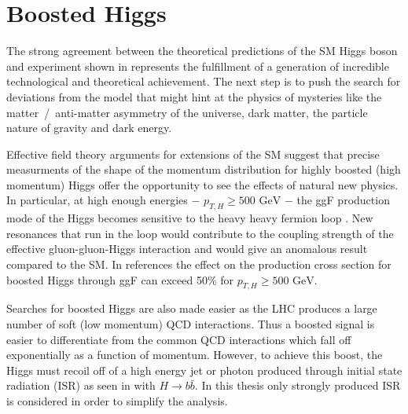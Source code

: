 \section{Boosted Higgs} \label{sec:higgs:boosted}

The strong agreement between the theoretical predictions of the SM Higgs boson
and experiment shown in  represents the
fulfillment of a generation of incredible technological and theoretical
achievement.  The next step is to push the search for deviations from the model
that might hint at the physics of mysteries like the matter~/~anti-matter
asymmetry of the universe, dark matter, the particle nature of gravity and dark
energy. 

Effective field theory arguments for extensions of the SM suggest that precise
measurments of the shape of the momentum distribution for highly boosted (high
momentum) Higgs offer the opportunity to see the effects of natural new
physics.  In particular, at high enough energies $-$ $p_{T,H} \geq \text{500
GeV}$ $-$ the ggF production mode of the Higgs becomes sensitive to the heavy
heavy fermion loop \cite{Schlaffer:2014osa}.  New resonances that run in the
loop would contribute to the coupling strength of the effective
gluon-gluon-Higgs interaction and would give an anomalous result compared to
the SM. In references \cite{Schlaffer:2014osa,Grojean:2013nya,Dawson:2015gka}
the effect on the production cross section for boosted Higgs through ggF can
exceed 50\% for $p_{T,H} \geq \text{500 GeV}$.

Searches for boosted Higgs are also made easier as the LHC produces a large
number of soft (low momentum) QCD interactions.  Thus a boosted signal is
easier to differentiate from the common QCD interactions which fall off
exponentially as a function of momentum.  However, to achieve this boost, the
Higgs must recoil off of a high energy jet or photon \cite{Aaboud:2018zba}
produced through initial state radiation (ISR) as seen in 
with $H \rightarrow b\bar{b}$. In this thesis only strongly produced ISR is
considered in order to simplify the analysis.

